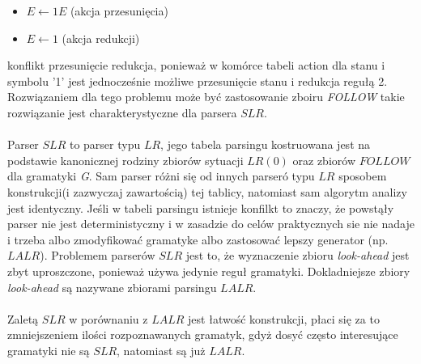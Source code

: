 {\begin{itemize}
\item $E \leftarrow 1 E $ (akcja przesunięcia)
\item $ E \leftarrow 1 $ (akcja redukcji)
\end{itemize}
konflikt przesunięcie redukcja, ponieważ w komórce tabeli action dla stanu i symbolu '1' jest jednocześnie możliwe przesunięcie stanu i redukcja regułą 2. Rozwiązaniem dla tego problemu może być zastosowanie zboiru \textit{FOLLOW} takie rozwiązanie jest charakterystyczne dla parsera $SLR$.
\\~\\
Parser $SLR$ to parser typu $LR$, jego tabela parsingu kostruowana jest na podstawie kanonicznej rodziny zbiorów sytuacji $LR(0)$ oraz zbiorów $FOLLOW$ dla gramatyki \textit{G}. Sam parser różni się od innych parseró typu $LR$ sposobem konstrukcji(i zazwyczaj zawartością) tej tablicy, natomiast sam algorytm analizy jest identyczny. Jeśli w tabeli parsingu istnieje konfilkt to znaczy, że powstąły parser nie jest deterministyczny i w zasadzie do celów praktycznych sie nie nadaje i trzeba albo zmodyfikować gramatyke albo zastosować lepszy generator (np. $LALR$).  Problemem parserów $SLR$ jest to, że wyznaczenie zbioru \textit{look-ahead} jest zbyt uproszczone, ponieważ używa jedynie reguł gramatyki. Dokladniejsze zbiory \textit{look-ahead} są nazywane zbiorami parsingu $LALR$.
\\~\\
Zaletą $SLR$ w porównaniu z $LALR$ jest łatwość konstrukcji, płaci się za to zmniejszeniem ilości rozpoznawanych gramatyk, gdyż dosyć często interesujące gramatyki nie są $SLR$, natomiast są już $LALR$.
}
{}

